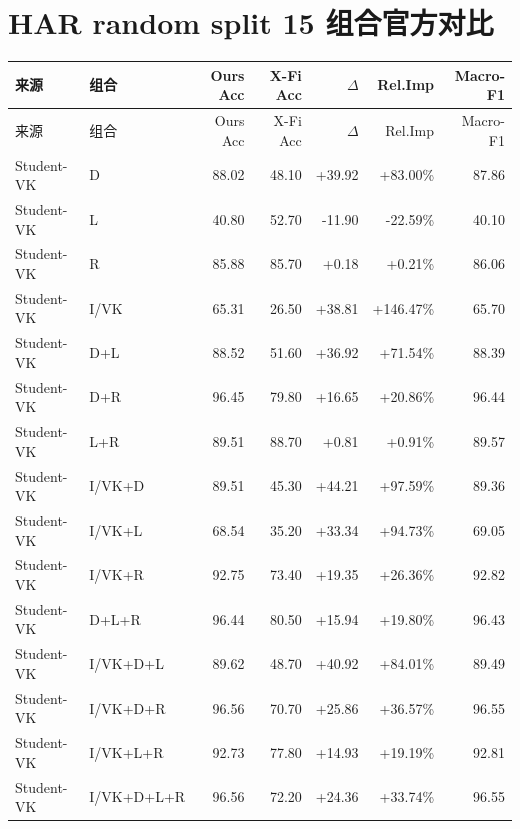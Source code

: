 \documentclass[UTF8,10pt,a4paper]{ctexart}
\newcommand{\better}[1]{\textcolor{ImpBlue}{#1}}
\newcommand{\worse}[1]{\textcolor{DropRed}{#1}}
\begin{document}
\section{HAR random split 15 组合官方对比}
{\tiny
\begin{longtable}{llrrrrr}
\toprule
来源 & 组合 & Ours Acc & X-Fi Acc & $\Delta$ & Rel.Imp & Macro-F1\\
\midrule
\endfirsthead
\toprule
来源 & 组合 & Ours Acc & X-Fi Acc & $\Delta$ & Rel.Imp & Macro-F1\\
\midrule
\endhead
Student-VK & D & 88.02 & 48.10 & \better{+39.92} & \better{+83.00\%} & 87.86\\
Student-VK & L & 40.80 & 52.70 & \worse{-11.90} & \worse{-22.59\%} & 40.10\\
Student-VK & R & 85.88 & 85.70 & \better{+0.18} & \better{+0.21\%} & 86.06\\
Student-VK & I/VK & 65.31 & 26.50 & \better{+38.81} & \better{+146.47\%} & 65.70\\
Student-VK & D+L & 88.52 & 51.60 & \better{+36.92} & \better{+71.54\%} & 88.39\\
Student-VK & D+R & 96.45 & 79.80 & \better{+16.65} & \better{+20.86\%} & 96.44\\
Student-VK & L+R & 89.51 & 88.70 & \better{+0.81} & \better{+0.91\%} & 89.57\\
Student-VK & I/VK+D & 89.51 & 45.30 & \better{+44.21} & \better{+97.59\%} & 89.36\\
Student-VK & I/VK+L & 68.54 & 35.20 & \better{+33.34} & \better{+94.73\%} & 69.05\\
Student-VK & I/VK+R & 92.75 & 73.40 & \better{+19.35} & \better{+26.36\%} & 92.82\\
Student-VK & D+L+R & 96.44 & 80.50 & \better{+15.94} & \better{+19.80\%} & 96.43\\
Student-VK & I/VK+D+L & 89.62 & 48.70 & \better{+40.92} & \better{+84.01\%} & 89.49\\
Student-VK & I/VK+D+R & 96.56 & 70.70 & \better{+25.86} & \better{+36.57\%} & 96.55\\
Student-VK & I/VK+L+R & 92.73 & 77.80 & \better{+14.93} & \better{+19.19\%} & 92.81\\
Student-VK & I/VK+D+L+R & 96.56 & 72.20 & \better{+24.36} & \better{+33.74\%} & 96.55\\
\bottomrule
\end{longtable}
}
\end{document}
